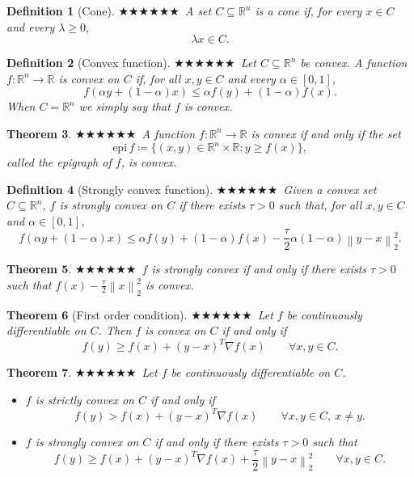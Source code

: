 \documentclass[11pt,a4paper]{article}
\newcommand{\R}{\mathbb{R}}
\newcommand{\norm}[1]{\left\lVert #1 \right\rVert}
\theoremstyle{breakdef}
\newtheorem{definition}{Definition}[section]
\theoremstyle{breakplain}
\newtheorem{theorem}[definition]{Theorem}
\theoremstyle{remark}
\newcommand{\imp}[1]{\textcolor{impcolor}{%
  \ifcase#1\or$\bigstar$\or$\bigstar\bigstar$\or$\bigstar\bigstar\bigstar$\fi}\ }
\begin{document}
\begin{definition}[Cone]
\imp{1}A set $C \subseteq \R^n$ is a \emph{cone} if, for every $x \in C$ and every $\lambda \ge 0$,
\[
    \lambda x \in C.
\]
\end{definition}

\begin{definition}[Convex function]
\imp{3}Let $C \subseteq \R^n$ be convex. A function $f: \R^n \to \R$ is \emph{convex} on $C$ if, for all $x,y \in C$ and every $\alpha \in [0,1]$,
\[
    f(\alpha y + (1-\alpha)x) \le \alpha f(y) + (1-\alpha)f(x).
\]
When $C = \R^n$ we simply say that $f$ is convex.
\end{definition}

\begin{theorem}
\imp{2}A function $f:\R^n \to \R$ is convex if and only if the set
\[
    \mathrm{epi}\, f \coloneqq \{(x,y) \in \R^{n} \times \R : y \ge f(x)\},
\]
called the \emph{epigraph} of $f$, is convex.
\end{theorem}

\begin{definition}[Strongly convex function]
\imp{3}Given a convex set $C \subseteq \R^n$, $f$ is \emph{strongly convex} on $C$ if there exists $\tau > 0$ such that, for all $x, y \in C$ and $\alpha \in [0,1]$,
\[
    f(\alpha y + (1-\alpha)x) \le \alpha f(y) + (1-\alpha)f(x) - \frac{\tau}{2}\alpha(1-\alpha)\norm{y-x}_2^2.
\]
\end{definition}

\begin{theorem}
\imp{2}$f$ is strongly convex if and only if there exists $\tau > 0$ such that $f(x) - \frac{\tau}{2}\norm{x}_2^2$ is convex.
\end{theorem}

\begin{theorem}[First order condition]
\imp{3}Let $f$ be continuously differentiable on $C$. Then $f$ is convex on $C$ if and only if
\[
    f(y) \ge f(x) + (y-x)^T \nabla f(x) \qquad \forall x,y \in C.
\]
\end{theorem}

\begin{theorem}
\imp{3}Let $f$ be continuously differentiable on $C$.
\begin{itemize}
    \item $f$ is strictly convex on $C$ if and only if
    \[
        f(y) > f(x) + (y-x)^T \nabla f(x) \qquad \forall x,y \in C,\ x \ne y.
    \]
    \item $f$ is strongly convex on $C$ if and only if there exists $\tau > 0$ such that
    \[
        f(y) \ge f(x) + (y-x)^T \nabla f(x) + \frac{\tau}{2}\norm{y-x}_2^2 \qquad \forall x,y \in C.
    \]
\end{itemize}
\end{theorem}
\end{document}

